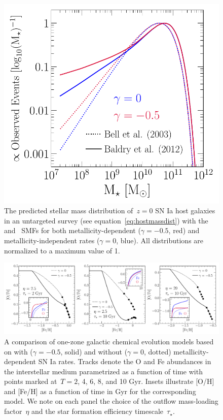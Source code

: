 \documentclass[foo.tex]{subfiles}
\begin{document}
\begin{figure}
\centering
\includegraphics[scale = 0.55]{ia_massdist.pdf}
\caption{
The predicted stellar mass distribution of~$z = 0$ SN Ia host galaxies in an
untargeted survey (see equation~\ref{eq:hostmassdist}) with the
\citet[][dotted]{Bell2003} and~\citet[][solid]{Baldry2012} SMFs for both
metallicity-dependent ($\gamma = -0.5$, red) and metallicity-independent rates
($\gamma = 0$, blue).
All distributions are normalized to a maximum value of 1.
}
\label{fig:hostmassdist}
\end{figure}

\begin{figure}
\centering
\includegraphics[scale = 0.46]{onezone_application.pdf}
\caption{
A comparison of one-zone galactic chemical evolution models based on
\citet[][for details, see their~\S~2]{Johnson2020} with ($\gamma = -0.5$,
solid) and without ($\gamma = 0$, dotted) metallicity-dependent SN Ia rates.
Tracks denote the O and Fe abundances in the interstellar medium parametrized
as a function of time with points marked at~$T = 2$, 4, 6, 8, and 10 Gyr.
Insets illustrate [O/H] and [Fe/H] as a function of time in Gyr for the
corresponding model.
We note on each panel the choice of the outflow mass-loading factor~$\eta$ and
the star formation efficiency timescale~$\tau_\star$.
}
\label{fig:onezone_app}
\end{figure}
\end{document}

